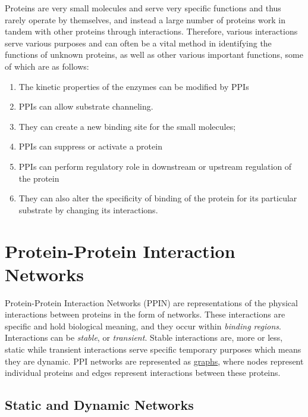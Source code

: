 Proteins are very small molecules and serve very specific functions and thus rarely operate by themselves, and 
instead a large number of proteins work in tandem with other proteins through interactions. Therefore, various 
interactions serve various purposes and can often be a vital method in identifying the functions of unknown 
proteins, as well as other various important functions, some of which are as follows: \cite{Ijaz18}
\begin{enumerate}
    \item The kinetic properties of the enzymes can be modified by PPIs 
    \item PPIs can allow substrate channeling.
    \item They can create a new binding site for the small molecules; \item PPIs can suppress or activate a protein
    \item PPIs can perform regulatory role in downstream or upstream regulation of the protein
    \item They can also alter the specificity of binding of the protein for its particular substrate by changing its interactions.
\end{enumerate}

\section{Protein-Protein Interaction Networks}
Protein-Protein Interaction Networks (PPIN) are representations of the physical 
interactions between proteins in the form of networks. These interactions are 
specific and hold biological meaning, and they occur within \textit{binding 
regions}. Interactions can be \textit{stable}, or \textit{transient}. Stable 
interactions are, more or less, static while transient interactions serve specific temporary purposes which means they are dynamic. 
PPI networks are represented as \href{https://en.wikipedia.org/wiki/Graph_(discrete_mathematics)}{graphs}, 
where nodes represent individual proteins and edges represent interactions between these proteins. 

\subsection{Static and Dynamic Networks}


